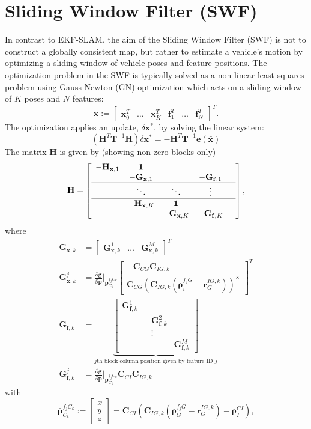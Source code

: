 \documentclass[letterpaper, 10 pt, conference]{ieeeconf}  %
\def\Vec#1{\mathbf{#1}}
\newcommand{\bbm}{\begin{bmatrix}}
\newcommand{\ebm}{\end{bmatrix}}
\newcommand{\pd}[2]{\frac{\partial #1}{\partial #2}}
\begin{document}
\section{Sliding Window Filter (SWF)} \label{sec:SWF}
In contrast to EKF-SLAM, the aim of the Sliding Window Filter (SWF) is not to construct a globally consistent map, but rather to estimate a vehicle's motion by optimizing a sliding window of vehicle poses and feature positions.
The optimization problem in the SWF is typically solved as a non-linear least squares problem using Gauss-Newton (GN) optimization which acts on a sliding window of $K$ poses and $N$ features: 
\begin{equation}
\Vec{x} := \bbm \Vec x_0^T & \hdots & \Vec x_K^T & \Vec f_1^T & \hdots & \Vec f_N^T\ebm ^T.
\end{equation}
The optimization applies an update, $ \delta \Vec{x}^*$, by solving the linear system:
\begin{equation}
(\Vec H^T \Vec T ^{-1} \Vec H ) \delta \Vec{x}^*  = - \Vec{H}^T\Vec{T}^{-1}\Vec{e}(\bar{\Vec{x}})
\end{equation}
The matrix $\Vec{H}$ is given by (showing non-zero blocks only)
\begin{equation}
\mathbf{H} = \left[\begin{array}{cccccc}
 -\Vec H_{\Vec x, 1} & \Vec 1 & & &   \\ 
 & -\Vec G_{\Vec x, 1} &  &   -\Vec G_{\Vec f, 1} \\ \hline
 & \ddots & \ddots & \vdots  \\  \hline
 & -\Vec H_{\Vec x, K} & \Vec 1 & \\ 
 & & -\Vec G_{\Vec x, K} &  -\Vec G_{\Vec f, K}   \\  
\end{array}\right], 
\end{equation}
where
\begin{align}
\Vec G_{\Vec x, k} &= \bbm \Vec G_{\Vec x, k}^1 & \hdots & \Vec G_{\Vec x, k}^M \ebm ^T
\\[0.5em]
\Vec G_{\Vec{x}, k}^j &= \pd{\Vec g}{ \Vec p}\Bigr|_{\bar{\Vec p}_{C_k}^{f_j C_k}}
    \bbm -\Vec C_{CG} \Vec C_{IG,k} \\[0.5em] \Vec C_{CG} (\Vec C_{IG,k} (\boldsymbol{\rho}_i^{f_j G} - \Vec r_G^{IG,k} ) )^\times  \ebm ^T
\\[0.5em]
\Vec G_{\Vec f, k} &= \underbrace{\bbm \Vec G_{\Vec f, k}^1 & & \\ & & \Vec G_{\Vec f, k}^2 & \\ & & \vdots &  \\ & & & \Vec G_{\Vec f, k}^M \ebm}_{\text{$j$th block column position given by feature ID $j$}} \\[0.5em]
\Vec G_{\Vec f, k}^j &= \pd{\Vec g}{ \Vec p}\Bigr|_{\bar{\Vec p}_{C_k}^{f_j C_k}} \Vec C_{CI} \Vec C_{IG,k}
\end{align}
with
\begin{equation}
\bar{\Vec p}_{C_k}^{f_j C_k} := \bbm x \\ y \\ z \ebm = \Vec C_{CI} \left( \Vec C_{IG,k} (\boldsymbol{\rho}_G^{f_j G} - \Vec r_G^{IG,k} )   - \boldsymbol \rho_I^{CI} \right),
\end{equation}
\end{document}
